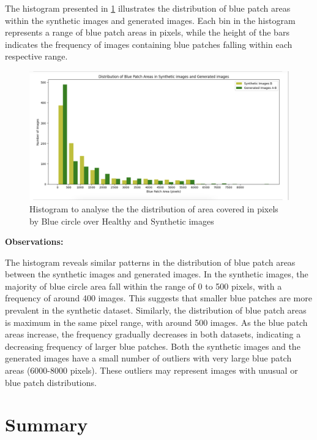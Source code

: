 \documentclass[UKenglish,12pt]{master-style}
\begin{document}
The histogram presented in \ref{fig:Blue_circle_area} illustrates the distribution of blue patch areas within the synthetic images and generated images. Each bin in the histogram represents a range of blue patch areas in pixels, while the height of the bars indicates the frequency of images containing blue patches falling within each respective range.

\begin{figure}[htbp]
    \centering
    \includegraphics[width=1\textwidth]{Images/Blue_circle_area.png}
    \caption{Histogram to analyse the the distribution of area covered in pixels by Blue circle over Healthy and Synthetic images}
    \label{fig:Blue_circle_area}
\end{figure}

\textbf{Observations:}

The histogram reveals similar patterns in the distribution of blue patch areas between the synthetic images and generated images.
In the synthetic images, the majority of blue circle area fall within the range of 0 to 500 pixels, with a frequency of around 400 images. This suggests that smaller blue patches are more prevalent in the synthetic dataset. Similarly, the distribution of blue patch areas is maximum in the same pixel range, with around 500 images.
As the blue patch areas increase, the frequency gradually decreases in both datasets, indicating a decreasing frequency of larger blue patches. Both the synthetic images and the generated images have a small number of outliers with very large blue patch areas (6000-8000 pixels). These outliers may represent images with unusual or blue patch distributions.

\section{Summary}
\end{document}
